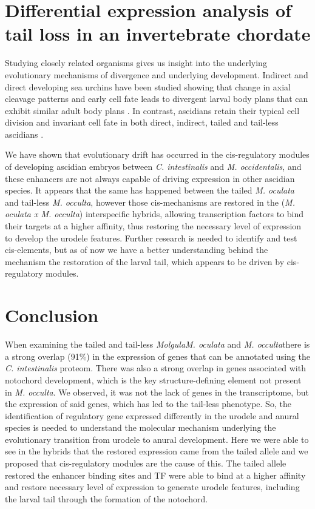 \section{Differential expression analysis of tail loss in an invertebrate chordate}
Studying closely related organisms gives us insight into the underlying evolutionary mechanisms of divergence and underlying development. Indirect and direct developing sea urchins have been studied showing that change in axial cleavage patterns and early cell fate leads to divergent larval body plans that can exhibit similar adult body plans \cite{wray_evolutionary_1989,henry_evolutionary_1990}. In contrast, ascidians retain their typical cell division and invariant cell fate in both direct, indirect, tailed and tail-less ascidians \cite{jeffery_evolutionary_1991,maliska_molgula_2010}. %
   
We have shown that evolutionary drift has occurred in the cis-regulatory modules of developing ascidian embryos between \textit{C. intestinalis} and \textit{M. occidentalis}, and these enhancers are not always capable of driving expression in other ascidian species. It appears that the same has happened between the tailed \textit{M. oculata} and tail-less \textit{M. occulta}, however those cis-mechanisms are restored in the (\textit{M. oculata x M. occulta}) interspecific hybrids, allowing transcription factors to bind their targets at a higher affinity, thus restoring the necessary level of expression to develop the urodele features. Further research is needed to identify and test cis-elements, but as of now we have a better understanding behind the mechanism the restoration of the larval tail, which appears to be driven by cis-regulatory modules.

\section{Conclusion}

When examining the tailed and tail-less \textit{Molgula}\textemdash \textit{M. oculata} and \textit{M. occulta}\textemdash there is a strong overlap (91\%) in the expression of genes that can be annotated using the \textit{C. intestinalis} proteom. There was also a strong overlap in genes associated with notochord development, which is the key structure-defining element not present in \textit{M. occulta}. We observed, it was not the lack of genes in the transcriptome, but the expression of said genes, which has led to the tail-less phenotype. So, the identification of regulatory gene expressed differently in the urodele and anural species is needed to understand the molecular mechanism underlying the evolutionary transition from urodele to anural development. Here we were able to see in the hybrids that the restored expression came from the tailed allele and we proposed that cis-regulatory modules are the cause of this. The tailed allele restored the enhancer binding sites and TF were able to bind at a higher affinity and restore necessary level of expression to generate urodele features, including the larval tail through the formation of the notochord.

